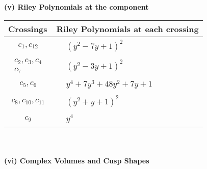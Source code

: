 \documentclass[1p]{elsarticle_modified}
\theoremstyle{definition}
\begin{document}
\newpage\renewcommand{\arraystretch}{1}
\flushleft \textbf{(v) Riley Polynomials at the component}\newline \\
\begin{tabular}{m{50pt}|m{274pt}}
Crossings & \hspace{64pt}Riley Polynomials at each crossing \\
\hline $$\begin{aligned}c_{1},c_{12}\end{aligned}$$&$\begin{aligned}
&(y^2-7 y+1)^2
\end{aligned}$\\
\hline $$\begin{aligned}c_{2},c_{3},c_{4}\\c_{7}\end{aligned}$$&$\begin{aligned}
&(y^2-3 y+1)^2
\end{aligned}$\\
\hline $$\begin{aligned}c_{5},c_{6}\end{aligned}$$&$\begin{aligned}
&y^4+7 y^3+48 y^2+7 y+1
\end{aligned}$\\
\hline $$\begin{aligned}c_{8},c_{10},c_{11}\end{aligned}$$&$\begin{aligned}
&(y^2+y+1)^2
\end{aligned}$\\
\hline $$\begin{aligned}c_{9}\end{aligned}$$&$\begin{aligned}
&y^4
\end{aligned}$\\
\hline
\end{tabular}\\~\\
\newpage\flushleft \textbf{(vi) Complex Volumes and Cusp Shapes}
\end{document}
